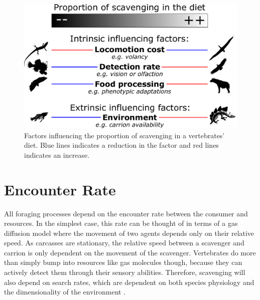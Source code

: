 \documentclass[a4paper,12pt]{article}
\begin{document}
\begin{figure}[!htbp]
\centering
   \includegraphics[width=1\textwidth]{Summary_figure/Summary_figure_Landscape.pdf}
\caption{Factors influencing the proportion of scavenging in a vertebrates' diet. Blue lines indicates a reduction in the factor and red lines indicates an increase.}
\label{Summary_figure}
\end{figure}


\section*{Encounter Rate}
All foraging processes depend on the encounter rate between the consumer and resources. 
In the simplest case, this rate can be thought of in terms of a gas diffusion model where the movement of two agents depends only on their relative speed.
As carcasses are stationary, the relative speed between a scavenger and carrion is only dependent on the movement of the scavenger. 
Vertebrates do more than simply bump into resources like gas molecules though, because they can actively detect them through their sensory abilities. 
Therefore, scavenging will also depend on search rates, which are dependent on both species physiology and the dimensionality of the environment \citep{pawar2012dimensionality}.
\end{document}
